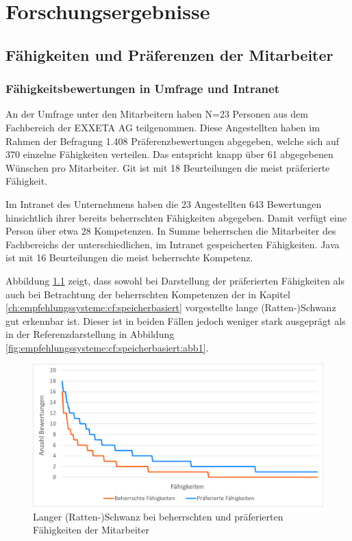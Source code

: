 \chapter{Forschungsergebnisse}
\label{ch:ergebnisse}

\section{Fähigkeiten und Präferenzen der Mitarbeiter}
\label{ch:ergebnisse:analyse}

\subsection{Fähigkeitsbewertungen in Umfrage und Intranet}
\label{ch:ergebnisse:analyse:intranetUndUmfrage}
An der Umfrage unter den Mitarbeitern haben N=23 Personen aus dem Fachbereich \JES der EXXETA AG teilgenommen. Diese Angestellten haben im Rahmen der Befragung 1.408 Präferenzbewertungen abgegeben, welche sich auf 370 einzelne Fähigkeiten verteilen. Das entspricht knapp über 61 abgegebenen Wünschen pro Mitarbeiter. Git ist mit 18 Beurteilungen die meist präferierte Fähigkeit.

Im Intranet des Unternehmens haben die 23 Angestellten 643 Bewertungen hinsichtlich ihrer bereits beherrschten Fähigkeiten abgegeben. Damit verfügt eine Person über etwa 28 Kompetenzen. In Summe beherrschen die Mitarbeiter des Fachbereichs  der \anzFaehigkeiten unterschiedlichen, im Intranet gespeicherten Fähigkeiten. Java ist mit 16 Beurteilungen die meist beherrschte Kompetenz.

Abbildung \ref{fig:ergebnisse:analyse:abb1} zeigt, dass sowohl bei Darstellung der präferierten Fähigkeiten als auch bei Betrachtung der beherrschten Kompetenzen der in Kapitel \ref{ch:empfehlungssysteme:cf:speicherbasiert} vorgestellte lange (Ratten-)Schwanz gut erkennbar ist. Dieser ist in beiden Fällen jedoch weniger stark ausgeprägt als in der Referenzdarstellung in Abbildung \ref{fig:empfehlungssysteme:cf:speicherbasiert:abb1}.

\begin{figure}[h]
	\centering
	\includegraphics[width=1\textwidth]{gfx/long-tail-insgesamt.png}
	\caption{Langer (Ratten-)Schwanz bei beherrschten und präferierten Fähigkeiten der Mitarbeiter}
	\label{fig:ergebnisse:analyse:abb1}
\end{figure}

